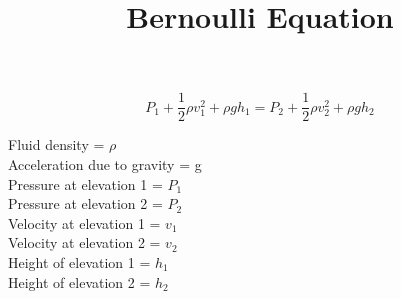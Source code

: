 \documentclass[../main.tex]{subfiles}
\title{Bernoulli Equation}
\begin{document}
\maketitle

\[P_{1}+\frac{1}{2}\rho v_{1}^2+\rho gh_{1} = P_{2}+\frac{1}{2}\rho v_{2}^2+\rho gh_{2}\]

Fluid density = $\rho$ \\
Acceleration due to gravity = g \\
Pressure at elevation 1 = $P_{1}$ \\
Pressure at elevation 2 = $P_{2}$ \\
Velocity at elevation 1 = $v_{1}$ \\
Velocity at elevation 2 = $v_{2} $\\
Height of elevation 1 = $h_{1}$ \\
Height of elevation 2 = $h_{2}$ \\
\end{document}
